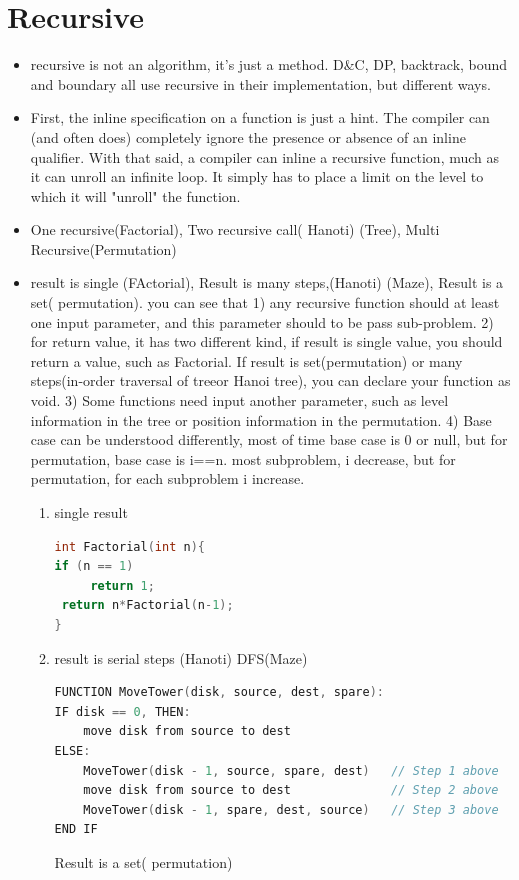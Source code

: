 \documentclass[a4paper,11pt,twoside]{book}
\begin{document}
\section{Recursive}
\begin{itemize}

	\item recursive is not an algorithm, it's just a method. D\&C, DP, backtrack, bound and boundary all use recursive in their implementation, but different ways. 
	
	\item First, the inline specification on a function is just a hint. The compiler can (and often does) completely ignore the presence or absence of an inline qualifier. With that said, a compiler can inline a recursive function, much as it can unroll an infinite loop. It simply has to place a limit on the level to which it will "unroll" the function.

	\item One recursive(Factorial),  Two recursive call( Hanoti) (Tree), Multi Recursive(Permutation)

	\item result is single (FActorial), Result is many steps,(Hanoti) (Maze), Result is a set( permutation). you can see that 1) any recursive function should at least one input parameter, and this parameter should to be pass sub-problem. 2) for return value, it has two different kind, if result is single value, you should return a value, such as Factorial. If result is set(permutation) or many steps(in-order traversal of treeor Hanoi tree), you can declare your function as void. 3) Some functions need input another parameter, such as level information in the tree or position information in the permutation. 4) Base case can be understood differently, most of time base case is 0 or null, but for permutation, base case is i==n.  most subproblem, i decrease, but for permutation, for each subproblem i increase. 
\begin{enumerate}
\item single result 
\begin{lstlisting}[frame=single, language=c++]
int Factorial(int n){
if (n == 1) 
     return 1;
 return n*Factorial(n-1);
}
\end{lstlisting}

	\item result is serial steps (Hanoti) DFS(Maze)
\begin{lstlisting}[frame=single, language=c++]
FUNCTION MoveTower(disk, source, dest, spare):
IF disk == 0, THEN:
    move disk from source to dest
ELSE:
    MoveTower(disk - 1, source, spare, dest)   // Step 1 above
    move disk from source to dest              // Step 2 above
    MoveTower(disk - 1, spare, dest, source)   // Step 3 above
END IF
\end{lstlisting}
Result is a set( permutation)


\end{enumerate}
\end{itemize}
\end{document}
